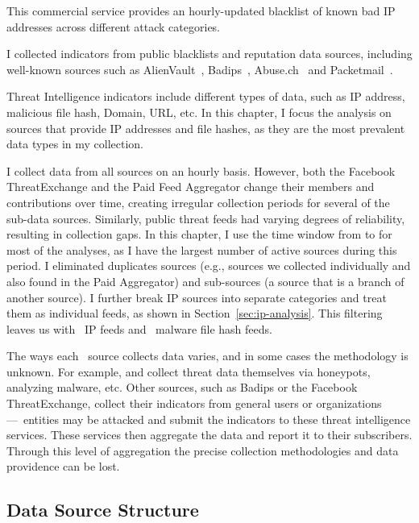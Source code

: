  This commercial service provides an
    hourly-updated blacklist of known bad IP addresses across different attack categories.

 I collected indicators from public
    blacklists and reputation data sources, including well-known
    sources such as AlienVault~\cite{Alienvault}, Badips~\cite{Badips}, Abuse.ch~\cite{Abuse-ch}
    and Packetmail~\cite{Packetmail}.

Threat Intelligence indicators include different types of data, such as IP address, malicious file hash, Domain,
URL, etc. In this chapter, I focus the analysis on sources that provide IP addresses and file hashes,
as they are the most prevalent data types in my collection.

I collect data from all sources on an hourly basis. However, both the Facebook
ThreatExchange and the Paid Feed Aggregator change their members and contributions
over time, creating irregular collection periods for several of the sub-data sources.
Similarly, public threat feeds had varying degrees of reliability, resulting in
collection gaps. In this chapter, I use the time window from 
to  for most of the analyses, as I have the largest number
of active sources during this period. I eliminated duplicates sources (e.g., sources
we collected individually and also found in the {Paid Aggregator}) and
sub-sources (a source that is a branch of another source). I further break IP
sources into separate categories and treat them as individual feeds, as shown in
Section~\ref{sec:ip-analysis}. This filtering leaves us with \numipfeeds\ IP feeds and
\numhashfeeds\ malware file hash feeds.

The ways each \ti\ source collects data varies, and in some cases
the methodology is unknown. For example, {\feedpacketmail} and {\feedetiprep}
collect threat data themselves via honeypots, analyzing malware, etc. Other
sources, such as {Badips} or the Facebook ThreatExchange, collect their
indicators from general users or organizations---\eg\ entities may be attacked
and submit the indicators to these threat intelligence services. These services
then aggregate the data and report it to their subscribers. Through this level of
aggregation the precise collection methodologies and data
providence can be lost.


\subsection{Data Source Structure}
\label{sec:feed-structure}

